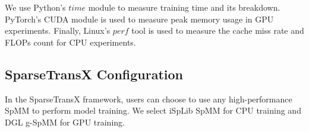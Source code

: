 We use Python's $time$ module to measure training time and its breakdown. PyTorch's CUDA module is used to measure peak memory usage in GPU experiments. Finally, Linux's $perf$ tool is used to measure the cache miss rate and FLOPs count for CPU experiments.


\subsection{SparseTransX Configuration}
In the SparseTransX framework, users can choose to use any high-performance SpMM to perform model training.
We select iSpLib SpMM \cite{hoque2024isplib} for CPU training and DGL g-SpMM \cite{wang2019deep} for GPU training.